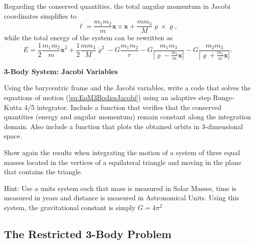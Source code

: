 Regarding the conserved quantities, the total angular momentum in Jacobi coordinates simplifies to
\begin{equation}
    \boldsymbol{\ell}=\frac{m_{1}m_{2}}{m}\textbf{x}\times\dot{\textbf{x}}+\frac{mm_{3}}{M}\boldsymbol{\varrho}\times\dot{\boldsymbol{\varrho}},
\end{equation}
while the total energy of the system can be rewritten as
\begin{equation}
    E=\frac{1}{2}\frac{m_{1}m_{2}}{m}\dot{\textbf{x}}^{2}+\frac{1}{2}\frac{mm_{3}}{M}\dot{\boldsymbol{\varrho}}^{2}-G\frac{m_{1}m_{2}}{r}-G\frac{m_{1}m_{3}}{\left\vert{}\boldsymbol{\varrho}-\frac{m_{2}}{m}\textbf{x}\right\vert{}}-G\frac{m_{2}m_{3}}{\left\vert{}\boldsymbol{\varrho}+\frac{m_{1}}{m}\textbf{x}\right\vert{}}.
\end{equation}

\begin{exercise}
 \textbf{3-Body System: Jacobi Variables}
 
 Using the barycentric frame and the Jacobi variables, write a code that solves the equations of motion (\ref{eq:EoM3BodiesJacobi}) using an adaptive step Runge-Kutta 4/5 integrator. Include a function that verifies that the conserved quantities (energy and angular momentum) remain constant along the integration domain. Also include a function that plots the obtained orbits in 3-dimensional space.

 Show again the results when integrating the motion of a system of three equal masses located in the vertices of a equilateral triangle and moving in the plane that contains the triangle.

Hint: Use a units system such that mass is measured in Solar Masses, time is measured in years and distance is measured in Astronomical Units. Using this system, the gravitational constant is simply $G=4\pi^2$
\end{exercise}

\subsection{The Restricted 3-Body Problem}

